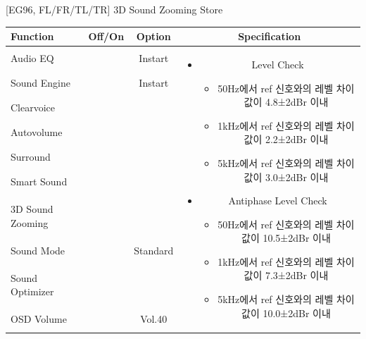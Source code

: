 \documentclass{beamer}
\begin{document}
\begin{frame}[t]{[EG96, FL/FR/TL/TR] 3D Sound Zooming Store}
\begin{tiny}
\begin{tabular}{@{}lccc@{}}
\toprule
Function & Off/On & Option & Specification \\
\midrule
Audio EQ & \color{black}{Off} & Instart &
\multirow{10}{60mm}{
\begin{itemize}
\item Level Check
	\begin{itemize}
	\item 50Hz에서 ref 신호와의 레벨 차이값이 4.8±2dBr 이내
	\item 1kHz에서 ref 신호와의 레벨 차이값이 2.2±2dBr 이내
	\item 5kHz에서 ref 신호와의 레벨 차이값이 3.0±2dBr 이내
	\end{itemize}
\item Antiphase Level Check
	\begin{itemize}
	\item 50Hz에서 ref 신호와의 레벨 차이값이 10.5±2dBr 이내
	\item 1kHz에서 ref 신호와의 레벨 차이값이 7.3±2dBr 이내
	\item 5kHz에서 ref 신호와의 레벨 차이값이 10.0±2dBr 이내
	\end{itemize}
\end{itemize}
} \\
Sound Engine & \color{blue}{On} & Instart & \\
Clearvoice & \color{black}{Off} & & \\
Autovolume & \color{black}{Off} & & \\
Surround & \color{black}{Off} & & \\
Smart Sound & \color{black}{Off} & & \\
3D Sound Zooming & \color{blue}{On} & & \\
Sound Mode & \color{blue}{On} & Standard & \\
Sound Optimizer & \color{black}{Off} & & \\
OSD Volume & \color{blue}{On} & Vol.40 & \\
\midrule
\end{tabular}
\end{tiny}

\end{frame}
\end{document}
